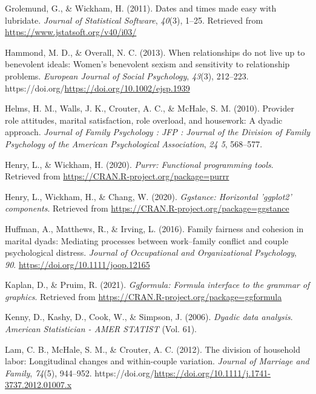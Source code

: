 \documentclass[
  man]{apa6}
\newlength{\cslhangindent}
\newlength{\cslentryspacingunit} %
\newenvironment{CSLReferences}[2] %
 {%
  \setlength{\parindent}{0pt}
  \ifodd #1
  \let\oldpar\par
  \def\par{\hangindent=\cslhangindent\oldpar}
  \fi
  \setlength{\parskip}{#2\cslentryspacingunit}
 }%
 {}
\begin{document}
\begin{CSLReferences}{1}{0}
\leavevmode{}%
Grolemund, G., \& Wickham, H. (2011). Dates and times made easy with {lubridate}. \emph{Journal of Statistical Software}, \emph{40}(3), 1--25. Retrieved from \url{https://www.jstatsoft.org/v40/i03/}

\leavevmode{}%
Hammond, M. D., \& Overall, N. C. (2013). When relationships do not live up to benevolent ideals: Women's benevolent sexism and sensitivity to relationship problems. \emph{European Journal of Social Psychology}, \emph{43}(3), 212--223. https://doi.org/\url{https://doi.org/10.1002/ejsp.1939}

\leavevmode{}%
Helms, H. M., Walls, J. K., Crouter, A. C., \& McHale, S. M. (2010). Provider role attitudes, marital satisfaction, role overload, and housework: A dyadic approach. \emph{Journal of Family Psychology : JFP : Journal of the Division of Family Psychology of the American Psychological Association}, \emph{24 5}, 568--577.

\leavevmode{}%
Henry, L., \& Wickham, H. (2020). \emph{Purrr: Functional programming tools}. Retrieved from \url{https://CRAN.R-project.org/package=purrr}

\leavevmode{}%
Henry, L., Wickham, H., \& Chang, W. (2020). \emph{Ggstance: Horizontal 'ggplot2' components}. Retrieved from \url{https://CRAN.R-project.org/package=ggstance}

\leavevmode{}%
Huffman, A., Matthews, R., \& Irving, L. (2016). Family fairness and cohesion in marital dyads: Mediating processes between work--family conflict and couple psychological distress. \emph{Journal of Occupational and Organizational Psychology}, \emph{90}. \url{https://doi.org/10.1111/joop.12165}

\leavevmode{}%
Kaplan, D., \& Pruim, R. (2021). \emph{Ggformula: Formula interface to the grammar of graphics}. Retrieved from \url{https://CRAN.R-project.org/package=ggformula}

\leavevmode{}%
Kenny, D., Kashy, D., Cook, W., \& Simpson, J. (2006). \emph{Dyadic data analysis}. \emph{American Statistician - AMER STATIST} (Vol. 61).

\leavevmode{}%
Lam, C. B., McHale, S. M., \& Crouter, A. C. (2012). The division of household labor: Longitudinal changes and within-couple variation. \emph{Journal of Marriage and Family}, \emph{74}(5), 944--952. https://doi.org/\url{https://doi.org/10.1111/j.1741-3737.2012.01007.x}


\end{CSLReferences}
\end{document}
